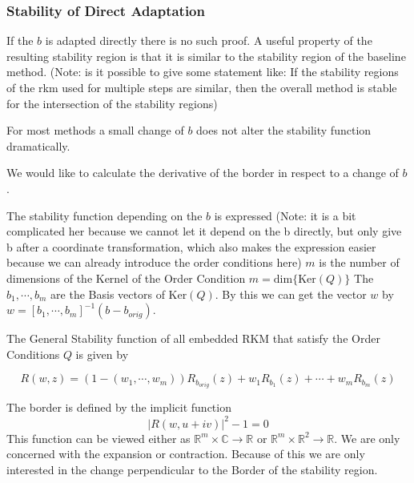 \documentclass{article}
\begin{document}
\subsubsection{Stability of  Direct Adaptation}
If the $b$ is adapted directly there is no such proof.
A useful property of the resulting stability region is that it is similar to the stability region of the baseline method. 
(Note: is it possible to give some statement like: If the stability regions of the rkm used for multiple steps are similar, then the overall method is stable for the intersection of the stability regions)

For most methods a small change of $b$ does not alter the stability function dramatically.

We would like to calculate the derivative of the border in respect to a change of $b$. 

The stability function depending on the $b$ is expressed (Note: it is a bit complicated her because we cannot let it depend on the b directly, but only give b after a coordinate transformation, which also makes the expression easier because we can already introduce the order conditions here)
$m$ is the number of dimensions of the Kernel of the Order Condition $m = \mathrm{dim}\{\mathrm{Ker} (Q) \}$
The $b_1,\cdots,b_m$  are the Basis vectors of $\mathrm{Ker} (Q)$. By this we can get the vector $w$ by $w = \left[b_1,\cdots,b_m\right]^{-1}(b-b_{orig})$.

The General Stability function of all embedded RKM that satisfy the Order Conditions $Q$ is given by 

\begin{equation}\label{eq:gen_stabilityf}
R(w,z) = (1-(w_1,\cdots,w_m))R_{b_{orig}}(z) + w_1 R_{b_1}(z) + \cdots + w_m R_{b_m}(z)
\end{equation}

The border is defined by the implicit function 
\begin{equation}\label{eq:border}
|R(w,u+iv)|^2 -1 = 0
\end{equation}
This function can be viewed either as $\mathbb{R}^m \times  \mathbb{C} \rightarrow \mathbb{R}$ or $\mathbb{R}^m \times  \mathbb{R}^2 \rightarrow \mathbb{R}$.
We are only concerned with the expansion or contraction. Because of this we are only interested in the change perpendicular to the Border of the stability region. 
\end{document}

